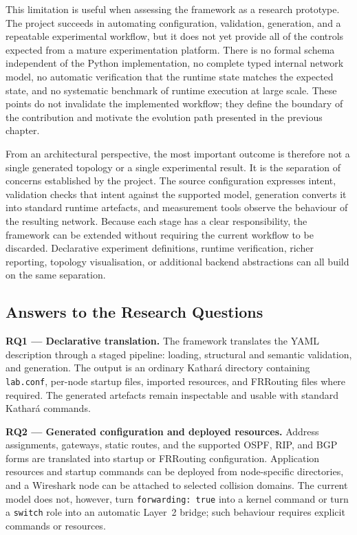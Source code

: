 This limitation is useful when assessing the framework as a research prototype.
The project succeeds in automating configuration, validation, generation, and a
repeatable experimental workflow, but it does not yet provide all of the
controls expected from a mature experimentation platform. There is no formal
schema independent of the Python implementation, no complete typed internal
network model, no automatic verification that the runtime state matches the
expected state, and no systematic benchmark of runtime execution at
large scale. These points do not invalidate the implemented workflow; they
define the boundary of the contribution and motivate the evolution path
presented in the previous chapter.

From an architectural perspective, the most important outcome is therefore not
a single generated topology or a single experimental result. It is the
separation of concerns established by the project. The source configuration
expresses intent, validation checks that intent against the supported model,
generation converts it into standard runtime artefacts, and measurement tools
observe the behaviour of the resulting network. Because each stage has a clear
responsibility, the framework can be extended without requiring the current
workflow to be discarded. Declarative experiment definitions, runtime
verification, richer reporting, topology visualisation, or additional backend
abstractions can all build on the same separation.


\subsection{Answers to the Research Questions}
\label{sec:conclusion-rq-answers}

\noindent\textbf{RQ1 --- Declarative translation.}
The framework translates the YAML description through a staged pipeline:
loading, structural and semantic validation, and generation. The output is an
ordinary Kathar\'a directory containing \texttt{lab.conf}, per-node startup
files, imported resources, and FRRouting files where required. The generated
artefacts remain inspectable and usable with standard Kathar\'a commands.

\noindent\textbf{RQ2 --- Generated configuration and deployed resources.}
Address assignments, gateways, static routes, and the supported OSPF, RIP, and
BGP forms are translated into startup or FRRouting configuration. Application
resources and startup commands can be deployed from node-specific directories,
and a Wireshark node can be attached to selected collision domains. The current
model does not, however, turn \texttt{forwarding: true} into a kernel command or
turn a \texttt{switch} role into an automatic Layer~2 bridge; such behaviour
requires explicit commands or resources.

